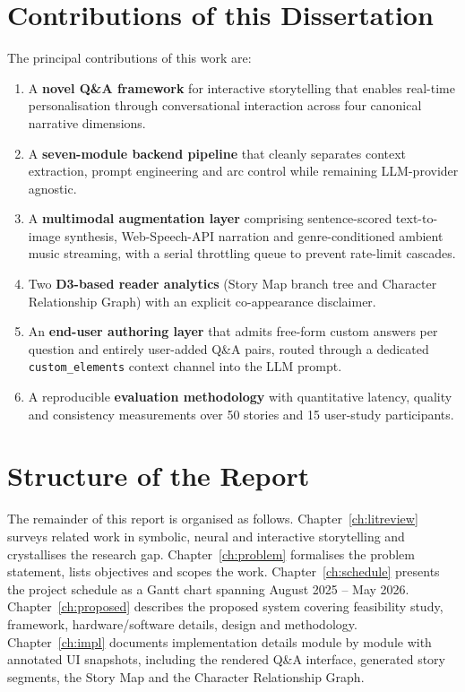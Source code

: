 \section{Contributions of this Dissertation}
The principal contributions of this work are:

\begin{enumerate}
    \item A \textbf{novel Q\&A framework} for interactive storytelling
    that enables real-time personalisation through conversational
    interaction across four canonical narrative dimensions.
    \item A \textbf{seven-module backend pipeline} that cleanly
    separates context extraction, prompt engineering and arc control
    while remaining LLM-provider agnostic.
    \item A \textbf{multimodal augmentation layer} comprising
    sentence-scored text-to-image synthesis, Web-Speech-API narration
    and genre-conditioned ambient music streaming, with a serial
    throttling queue to prevent rate-limit cascades.
    \item Two \textbf{D3-based reader analytics} (Story Map branch
    tree and Character Relationship Graph) with an explicit
    co-appearance disclaimer.
    \item An \textbf{end-user authoring layer} that admits free-form
    custom answers per question and entirely user-added Q\&A pairs,
    routed through a dedicated \texttt{custom\_elements} context
    channel into the LLM prompt.
    \item A reproducible \textbf{evaluation methodology} with
    quantitative latency, quality and consistency measurements over
    50 stories and 15 user-study participants.
\end{enumerate}

\section{Structure of the Report}
The remainder of this report is organised as follows.
Chapter~\ref{ch:litreview} surveys related work in symbolic, neural
and interactive storytelling and crystallises the research gap.
Chapter~\ref{ch:problem} formalises the problem statement, lists
objectives and scopes the work.
Chapter~\ref{ch:schedule} presents the project schedule as a Gantt
chart spanning August 2025 -- May 2026.
Chapter~\ref{ch:proposed} describes the proposed system covering
feasibility study, framework, hardware/software details, design and
methodology.
Chapter~\ref{ch:impl} documents implementation details module by
module with annotated UI snapshots, including the rendered Q\&A
interface, generated story segments, the Story Map and the Character
Relationship Graph.
